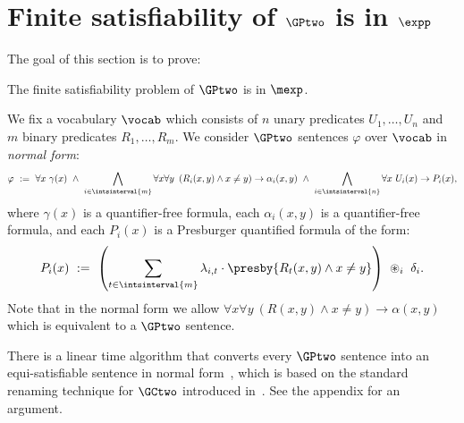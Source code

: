 \section{Finite satisfiability of $\GPtwo$ is in $\expp$}\label{sec:gptwo}

The goal of this section is to prove:
\begin{theorem} \label{thm:gptwoexp}
    The finite satisfiability problem of $\GPtwo$ is in $\mexp$.
\end{theorem}

We fix a vocabulary $\vocab$ which consists of $n$ unary predicates $U_1, \ldots, U_n$ and $m$ binary predicates $R_1, \ldots, R_m$.
We consider $\GPtwo$ sentences $\varphi$ over $\vocab$ in \emph{normal form}:
\begin{equation*}
    \varphi\ :=\ 
    \forall x\ \gamma(x)\ \land\ 
    \bigwedge_{i \in \intsinterval{m}} \forall x \forall y\ \left(R_i(x,y) \land x \neq y\right) \to \alpha_i(x, y)\ \land\ 
    \bigwedge_{i \in \intsinterval{n}} \forall x\ U_i(x) \to P_i(x),
\end{equation*}
where $\gamma(x)$ is a quantifier-free formula,
each $\alpha_i(x, y)$ is a quantifier-free formula, and
each $P_i(x)$ is a Presburger quantified formula of the form: 
\begin{equation*}
    P_i(x)\ :=\ \left(
        \sum_{t \in \intsinterval{m}} \lambda_{i, t} \cdot \presby{R_t(x, y) \land x \neq y}\right)
    \ \circledast_i\ \delta_i.
\end{equation*}
Note that in the normal form we allow
$
\forall x \forall y\ \left(R(x,y) \land x \neq y\right) \to \alpha(x, y)
$
which is equivalent to a $\GPtwo$  sentence.

There is a linear time algorithm that converts every $\GPtwo$ sentence into an equi-satisfiable sentence in normal form~\cite{twovarpres}, which is 
based on the standard renaming technique for $\GCtwo$ introduced in~\cite{Kazakov04,gctwocomplexity}.
See the appendix for an argument.

